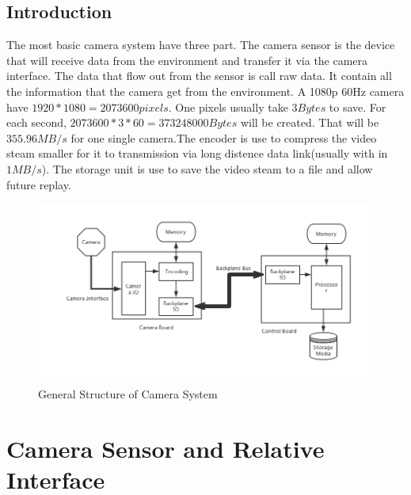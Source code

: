 \documentclass[12pt,article]{memoir}
\begin{document}
\section{Introduction}
The most basic camera system have three part. The camera sensor is the device that will receive data from the environment and transfer it via the camera interface. The data that flow out from the sensor is call raw data. It contain all the information that the camera get from the environment. A 1080p 60Hz camera have $1920*1080=2073600 pixels$. One pixels usually take $3 Bytes$ to save. For each second, $2073600*3*60=373248000Bytes$ will be created. That will be $355.96MB/s$ for one single camera.The encoder is use to compress the video steam smaller for it to transmission via long distence data link(usually with in $1MB/s$). The storage unit is use to save the video steam to a file and allow future replay.
\begin{figure}[htp]
\includegraphics[width=\textwidth]{DR00002_GenDia.png}
 \caption{General Structure of Camera System}	
\end{figure}
\newpage
%
\chapter{Camera Sensor and Relative Interface}
\end{document}
